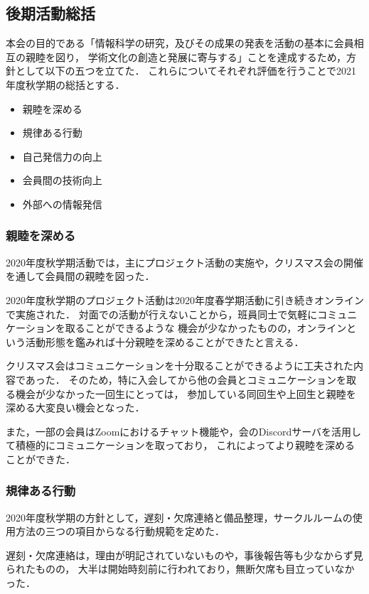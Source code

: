 \subsection*{後期活動総括}


本会の目的である「情報科学の研究，及びその成果の発表を活動の基本に会員相互の親睦を図り，
学術文化の創造と発展に寄与する」ことを達成するため，方針として以下の五つを立てた．
これらについてそれぞれ評価を行うことで2021年度秋学期の総括とする．

\begin{itemize}
    \item 親睦を深める
    \item 規律ある行動
    \item 自己発信力の向上
    \item 会員間の技術向上
    \item 外部への情報発信
\end{itemize}

\subsubsection*{親睦を深める}
    2020年度秋学期活動では，主にプロジェクト活動の実施や，クリスマス会の開催を通して会員間の親睦を図った．

    2020年度秋学期のプロジェクト活動は2020年度春学期活動に引き続きオンラインで実施された．
    対面での活動が行えないことから，班員同士で気軽にコミュニケーションを取ることができるような
    機会が少なかったものの，オンラインという活動形態を鑑みれば十分親睦を深めることができたと言える．

    クリスマス会はコミュニケーションを十分取ることができるように工夫された内容であった．
    そのため，特に入会してから他の会員とコミュニケーションを取る機会が少なかった一回生にとっては，
    参加している同回生や上回生と親睦を深める大変良い機会となった．

    また，一部の会員はZoomにおけるチャット機能や，会のDiscordサーバを活用して積極的にコミュニケーションを取っており，
    これによってより親睦を深めることができた．

\subsubsection*{規律ある行動}
    2020年度秋学期の方針として，遅刻・欠席連絡と備品整理，サークルルームの使用方法の三つの項目からなる行動規範を定めた．

    遅刻・欠席連絡は，理由が明記されていないものや，事後報告等も少なからず見られたものの，
    大半は開始時刻前に行われており，無断欠席も目立っていなかった．

